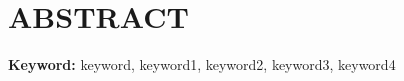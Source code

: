 \chapter{ABSTRACT}
\lipsum[1]

\vspace{11pt}

\textbf{Keyword:} keyword, keyword1, keyword2, keyword3, keyword4

